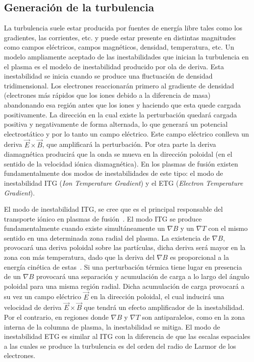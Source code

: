 \subsection{Generación de la turbulencia}\label{subsec:turbgen}
La turbulencia suele estar producida por fuentes de energía libre tales como los gradientes,
las corrientes, etc. y puede estar presente en distintas magnitudes como campos eléctricos,
campos magnéticos, densidad, temperatura, etc. 
Un modelo ampliamente aceptado de las inestabilidades que inician la turbulencia en el
plasma es el modelo de inestabilidad producido por ola de deriva. Esta inestabilidad se inicia 
cuando se produce
una fluctuación de densidad tridimensional. Los electrones
reaccionarán primero al gradiente de densidad (electrones más rápidos que los iones debido
a la diferencia de masa) abandonando esa región antes que los iones y haciendo que esta
quede cargada positivamente. La dirección en la cual existe la perturbación quedará cargada
positiva y negativamente de forma alternada, lo que generará un potencial electrostático y
por lo tanto un campo eléctrico. Este campo
eléctrico conlleva un deriva $\vec{E}\times\vec{B}$, 
que amplificará la perturbación. Por otra parte la deriva
diamagnética producirá que la onda se mueva en la dirección poloidal (en el sentido de la
velocidad iónica diamagnética). 
En los plasmas de fusión existen fundamentalmente
dos modos de inestabilidades de este tipo: el modo de inestabilidad ITG (\textit{Ion Temperature
Gradient}) y el ETG (\textit{Electron Temperature Gradient}).\par
El modo de inestabilidad ITG, se cree que es el principal responsable del transporte iónico
en plasmas de fusión~\cite{Hamaguchi_1992,doi:10.1063/1.859860}. El modo ITG se produce fundamentalmente 
cuando existe
simultáneamente un $\nabla B$ y un $\nabla T$ con el mismo sentido en una determinada zona radial del
plasma. La existencia de $\nabla B$,
provocará una deriva poloidal sobre las partículas, dicha deriva será mayor en la zona con más
temperatura, dado que la deriva del $\nabla B$ es proporcional a la energía cinética de estas~\cite{goldston1995introduction}.
Si una perturbación térmica tiene lugar en presencia de un $\nabla B$ provocará una separación
y acumulación de carga a lo largo del ángulo poloidal para una misma región radial. 
Dicha acumulación de carga provocará a su vez un campo
eléctrico $\vec{E}$
en la dirección poloidal, el cual inducirá una velocidad de deriva $\vec{E}\times\vec{B}$ 
que tendrá un efecto amplificador de la inestabilidad.
Por el contrario, en regiones donde $\nabla B$ y $\nabla T$ son antiparalelos, como en la zona interna de
la columna de plasma, la inestabilidad se mitiga.
El modo de inestabilidad ETG es similar al ITG con la diferencia de que las escalas espaciales
a las cuales se produce la turbulencia es del orden del radio de Larmor de los electrones.
